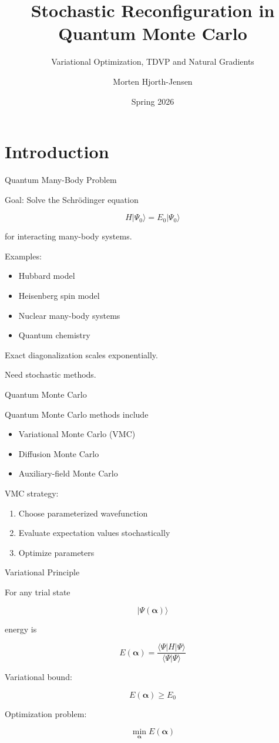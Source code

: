 \documentclass{beamer}
\title{Stochastic Reconfiguration in Quantum Monte Carlo}
\subtitle{Variational Optimization, TDVP and Natural Gradients}
\author{Morten Hjorth-Jensen}
\date{Spring 2026}
\begin{document}
\frame{\titlepage}

\section{Introduction}

\begin{frame}{Quantum Many-Body Problem}

Goal: Solve the Schrödinger equation

\[
H|\Psi_0\rangle = E_0 |\Psi_0\rangle
\]

for interacting many-body systems.

Examples:

\begin{itemize}
\item Hubbard model
\item Heisenberg spin model
\item Nuclear many-body systems
\item Quantum chemistry
\end{itemize}

Exact diagonalization scales exponentially.

Need stochastic methods.
\end{frame}

\begin{frame}{Quantum Monte Carlo}

Quantum Monte Carlo methods include

\begin{itemize}
\item Variational Monte Carlo (VMC)
\item Diffusion Monte Carlo
\item Auxiliary-field Monte Carlo
\end{itemize}

VMC strategy:

\begin{enumerate}
\item Choose parameterized wavefunction
\item Evaluate expectation values stochastically
\item Optimize parameters
\end{enumerate}
\end{frame}

\begin{frame}{Variational Principle}

For any trial state

\[
|\Psi(\bm{\alpha})\rangle
\]

energy is

\[
E(\bm{\alpha}) =
\frac{\langle \Psi|H|\Psi\rangle}
{\langle \Psi|\Psi\rangle}
\]

Variational bound:

\[
E(\bm{\alpha}) \ge E_0
\]

Optimization problem:

\[
\min_{\bm{\alpha}} E(\bm{\alpha})
\]
\end{frame}
\end{document}
